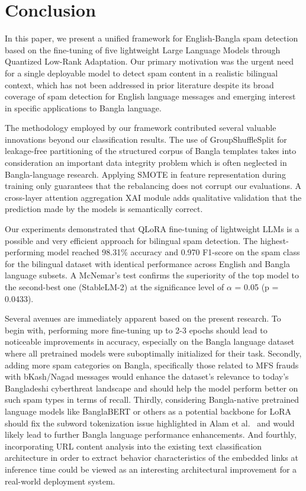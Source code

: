 \documentclass[journal]{IEEEtran}
\begin{document}
\balance
\section{Conclusion}

In this paper, we present a unified framework for English-Bangla spam
detection based on the fine-tuning of five lightweight Large Language
Models through Quantized Low-Rank Adaptation. Our primary motivation was
the urgent need for a single deployable model to detect spam content in
a realistic bilingual context, which has not been addressed in prior
literature despite its broad coverage of spam detection for English
language messages and emerging interest in specific applications to
Bangla language.

The methodology employed by our framework contributed several valuable
innovations beyond our classification results. The use of
GroupShuffleSplit for leakage-free partitioning of the structured corpus
of Bangla templates takes into consideration an important data integrity
problem which is often neglected in Bangla-language research. Applying
SMOTE in feature representation during training only guarantees that the
rebalancing does not corrupt our evaluations. A cross-layer attention
aggregation XAI module adds qualitative validation that the prediction
made by the models is semantically correct.

Our experiments demonstrated that QLoRA fine-tuning of lightweight LLMs
is a possible and very efficient approach for bilingual spam detection.
The highest-performing model reached 98.31\% accuracy and 0.970 F1-score
on the spam class for the bilingual dataset with identical performance
across English and Bangla language subsets. A McNemar's test confirms
the superiority of the top model to the second-best one (StableLM-2) at
the significance level of $\alpha$ = 0.05 (p = 0.0433).

Several avenues are immediately apparent based on the present research.
To begin with, performing more fine-tuning up to 2-3 epochs should lead
to noticeable improvements in accuracy, especially on the Bangla
language dataset where all pretrained models were suboptimally
initialized for their task. Secondly, adding more spam categories on
Bangla, specifically those related to MFS frauds with bKash/Nagad
messages would enhance the dataset's relevance to today's Bangladeshi
cyberthreat landscape and should help the model perform better on such
spam types in terms of recall. Thirdly, considering Bangla-native
pretrained language models like BanglaBERT or others as a potential
backbone for LoRA should fix the subword tokenization issue highlighted
in Alam et al.~\cite{ref4} and would likely lead to further Bangla language
performance enhancements. And fourthly, incorporating URL content
analysis into the existing text classification architecture in order to
extract behavior characteristics of the embedded links at inference time
could be viewed as an interesting architectural improvement for a
real-world deployment system.
\end{document}

